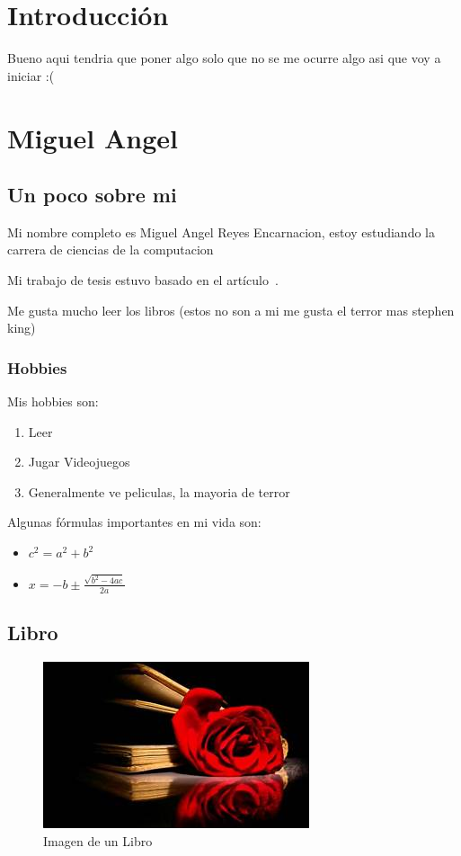 
\chapter*{Introducción}

Bueno aqui tendria que poner algo solo que no se me ocurre algo asi que voy a iniciar :(
\chapter{Miguel Angel}

\section{Un poco sobre mi}
Mi nombre completo es Miguel Angel Reyes Encarnacion, estoy estudiando la carrera de ciencias de la computacion

Mi trabajo de tesis estuvo basado en el artículo~\cite{Floodlight}.

Me gusta mucho leer los libros (estos no son a mi me gusta el terror mas stephen king)~\cite{torres,comunidad,retorno}

\subsection{Hobbies}
Mis hobbies son:
\begin{enumerate}
\item Leer
\item Jugar Videojuegos
\item Generalmente ve peliculas, la mayoria de terror
\end{enumerate}

\newpage
Algunas fórmulas importantes en mi vida son:
\begin{itemize}
\item $c^2 = a^2 + b^2$
\item $x=-b \pm \frac{\sqrt{b^2-4ac}}{2a}$
\end{itemize}

\section{Libro}
\begin{figure}[h]
  \centering
  \includegraphics[scale=0.5]{20.jpeg}
  \caption{Imagen de un Libro}
  \label{fig:Libro}
\end{figure}

